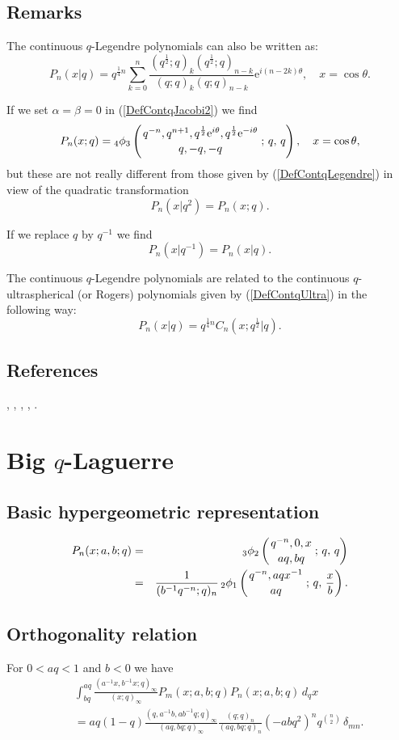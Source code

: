 \documentclass[envcountchap,graybox]{svmono}
\newcounter{rom}
\newcommand{\qhyp}[5]{\mbox{}_{#1}{\phi}_{#2}
\left(\genfrac{}{}{0pt}{}{#3}{#4}\,;\,q,\,#5\right)}
\newcommand{\e}{\textrm{e}}
\newcommand{\qhyp}[5]{\,\mbox{}_{#1}\phi_{#2}\!\left(
  \genfrac{}{}{0pt}{}{#3}{#4};#5\right)}
\begin{document}
\subsection*{Remarks} 
The continuous $q$-Legendre polynomials can also be written
as:
$$P_n(x|q)=q^{\frac{1}{4}n}\sum_{k=0}^n
\frac{(q^{\frac{1}{2}};q)_k(q^{\frac{1}{2}};q)_{n-k}}{(q;q)_k(q;q)_{n-k}}
\e^{i(n-2k)\theta},\quad x=\cos\theta.$$

\noindent
If we set $\alpha=\beta=0$ in (\ref{DefContqJacobi2}) we find
$$P_n(x;q)=\qhyp{4}{3}{q^{-n},q^{n+1},q^{\frac{1}{2}}\e^{i\theta},q^{\frac{1}{2}}\e^{-i\theta}}
{q,-q,-q}{q},\quad x=\cos\theta,$$
but these are not really different from those given by (\ref{DefContqLegendre})
in view of the quadratic transformation
$$P_n(x|q^2)=P_n(x;q).$$

\noindent
If we replace $q$ by $q^{-1}$ we find
$$P_n(x|q^{-1})=P_n(x|q).$$

\noindent
The continuous $q$-Legendre polynomials are related to the continuous
$q$-ultra\-spher\-i\-cal (or Rogers) polynomials given by (\ref{DefContqUltra}) in
the following way:
$$P_n(x|q)=q^{\frac{1}{4}n}C_n(x;q^{\frac{1}{2}}|q).$$

\subsection*{References}
\cite{KoelinkE}, \cite{Koelink94}, \cite{Koorn89I}, \cite{Koorn90II},
\cite{Koorn93}.


\section{Big $q$-Laguerre}
\par\setcounter{equation}{0}

\subsection*{Basic hypergeometric representation}
\begin{eqnarray}
\label{DefBigqLaguerre}
P_n(x;a,b;q)&=&\qhyp{3}{2}{q^{-n},0,x}{aq,bq}{q}\\
&=&\frac{1}{(b^{-1}q^{-n};q)_n}\,\qhyp{2}{1}{q^{-n},aqx^{-1}}{aq}{\frac{x}{b}}.\nonumber
\end{eqnarray}

\subsection*{Orthogonality relation}
For $0<aq<1$ and $b<0$ we have
\begin{eqnarray}
\label{OrtBigqLaguerre}
& &\int_{bq}^{aq}\frac{(a^{-1}x,b^{-1}x;q)_{\infty}}{(x;q)_{\infty}}
P_m(x;a,b;q)P_n(x;a,b;q)\,d_qx\nonumber\\
& &{}=aq(1-q)\frac{(q,a^{-1}b,ab^{-1}q;q)_{\infty}}
{(aq,bq;q)_{\infty}}\frac{(q;q)_n}{(aq,bq;q)_n}(-abq^2)^nq^{\binom{n}{2}}\,\delta_{mn}.
\end{eqnarray}
\end{document}
